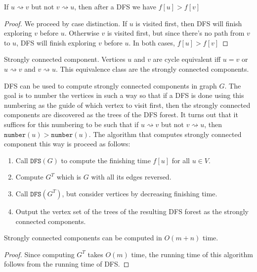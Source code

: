 \begin{lemma}
  If $u\rightsquigarrow v$ but not $v\rightsquigarrow u$, then after a DFS we have $f[u]>f[v]$
\end{lemma}
\begin{proof}
  We proceed by case distinction.  If $u$ is visited first, then DFS will
  finish exploring $v$ before $u$.  Otherwise $v$ is visited first, but since
  there's no path from $v$ to $u$, DFS will finish exploring $v$ before $u$.
  In both cases, $f[u]>f[v]$
\end{proof}

\begin{definition}{Strongly connected component.}
  Vertices $u$ and $v$ are cycle equivalent iff $u=v$ or $u\rightsquigarrow v$
  and $v\rightsquigarrow u$.  This equivalence class are the strongly connected
  components.
\end{definition}

DFS can be used to compute strongly connected components in graph $G$.  The
goal is to number the vertices in such a way so that if a DFS is done using
this numbering as the guide of which vertex to visit first, then the strongly
connected components are discovered as the trees of the DFS forest.  It turns
out that it suffices for this numbering to be such that if $u\rightsquigarrow
v$ but not $v\rightsquigarrow u$, then $\texttt{number}(u)>\texttt{number}(u)$.
The algorithm that computes strongly connected component this way is proceed as
follows:
\begin{enumerate}
  \item Call $\texttt{DFS}(G)$ to compute the finishing time $f[u]$ for all
    $u\in V$.
  \item Compute $G^T$ which is $G$ with all its edges reversed.
  \item Call $\texttt{DFS}(G^T)$, but consider vertices by decreasing finishing
    time.
  \item Output the vertex set of the trees of the resulting DFS forest as the
    strongly connected components.
\end{enumerate}

\begin{theorem}
  Strongly connected components can be computed in $O(m+n)$ time.
\end{theorem}
\begin{proof}
  Since computing $G^T$ takes $O(m)$ time, the running time of this algorithm
  follows from the running time of DFS.
\end{proof}


